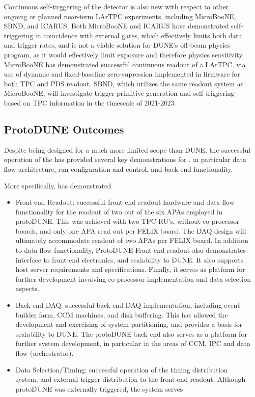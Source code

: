 Continuous self-tirggering of the detector is also new with respect to
other ongoing or planned near-term LArTPC experiments, including
MicroBooNE, SBND, and ICARUS. Both MicroBooNE and ICARUS have demonstrated
self-triggering in coincidence with external gates, which effectively
limits both data and trigger rates, and is not a viable solution for
DUNE's off-beam physics program, as it would effectively limit
exposure and therefore physics sensitivity. %
MicroBooNE has demonstrated successful continuous readout of a LArTPC,
via use of dynamic and fixed-baseline zero-supression implemented in
firmware for both TPC and PDS readout. SBND, which utilizes the same readout
system as MicroBooNE, will investigate trigger primitive generation
and self-triggering based on TPC information in the timescale of 2021-2023.


\subsection{ProtoDUNE Outcomes}

Despite being designed for a much more limited scope than DUNE, the %
successful operation of the   has provided several key
demonstrations for  , in particular data flow
architecture, run configuration and control, and back-end
functionality. %

More specifically,  has demonstrated 
\begin{itemize}
\item Front-end Readout: successful
front-end readout hardware and data flow functionality for the readout
of two out of the six APAs employed in protoDUNE. This was achieved
with two TPC RU's, without co-processor boards, and only one APA read
out per FELIX board. The  DAQ design will ultimately
accommodate readout of two APAs per FELIX board. In addition to data
flow functionality, ProtoDUNE Front-end readout also demonstrates interface to
front-end electronics, and scalability to DUNE. It also supports
host server requirements and specifications. Finally, it serves as
platform for further development involving co-processor implementation
and data selection aspects.
\item Back-end DAQ: successful back-end DAQ implementation, including event builder
  farm, CCM machines, and disk buffering. This has allowed the
  development and exercising of system partitioning, and provides a
  basis for scalability to DUNE. The protoDUNE back-end also serves as
  a platform for further system development, in particular in the
  areas of CCM, IPC and data flow (orchestrator).
\item Data Selection/Timing: successful operation of the timing
  distribution system, and external trigger distribution to the
  front-end readout. Although protoDUNE was externally triggered, the
  system serves
\end{itemize}

